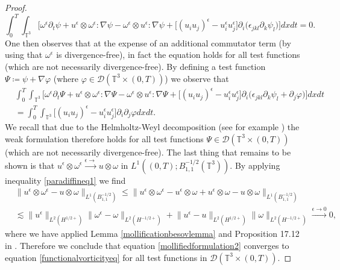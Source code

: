 \documentclass[12pt,a4paper]{article}
\theoremstyle{definition}
\theoremstyle{remark}
\numberwithin{equation}{section}
\begin{document}
\begin{proof}
\begin{equation*}
\int_0^T \int_{\mathbb{T}^3} \bigg[ \omega^\epsilon \partial_t \psi + u^\epsilon \otimes \omega^\epsilon : \nabla \psi - \omega^\epsilon \otimes u^\epsilon : \nabla \psi + \big[ (u_i u_j)^\epsilon - u_i^\epsilon u_j^\epsilon \big] \partial_i \big( \epsilon_{jkl} \partial_k \psi_l \big) \bigg] dx dt = 0.
\end{equation*}
One then observes that at the expense of an additional commutator term (by using that $\omega^\epsilon$ is divergence-free), in fact the equation holds for all test functions (which are not necessarily divergence-free). By defining a test function $\Psi \coloneqq \psi + \nabla \varphi$ (where $\varphi \in \mathcal{D} (\mathbb{T}^3 \times (0,T))$) we observe that
\begin{align}
&\int_0^T \int_{\mathbb{T}^3} \bigg[ \omega^\epsilon \partial_t \Psi + u^\epsilon \otimes \omega^\epsilon : \nabla \Psi - \omega^\epsilon \otimes u^\epsilon : \nabla \Psi + \big[ (u_i u_j)^\epsilon - u_i^\epsilon u_j^\epsilon \big] \partial_i \big( \epsilon_{jkl} \partial_k \psi_l + \partial_j \varphi \big) \bigg] dx dt \nonumber \\
&= \int_0^T \int_{\mathbb{T}^3} \big[ (u_i u_j)^\epsilon - u_i^\epsilon u_j^\epsilon \big] \partial_i \partial_j \varphi dx dt. \label{mollifiedformulation2}
\end{align}
We recall that due to the Helmholtz-Weyl decomposition (see for example \cite[~Theorem 2.6]{robinsonbook}) the weak formulation therefore holds for all test functions $\Psi \in \mathcal{D} (\mathbb{T}^3 \times (0,T))$ (which are not necessarily divergence-free). The last thing that remains to be shown is that $u^\epsilon \otimes \omega^\epsilon \xrightarrow[]{\epsilon \rightarrow} u \otimes \omega$ in $L^1 ((0,T); B^{-1/2}_{1,1} (\mathbb{T}^3))$. By applying inequality \eqref{paradiffineq1} we find
\begin{align*}
&\lVert u^\epsilon \otimes \omega^\epsilon - u \otimes \omega \rVert_{L^1 (B^{-1/2}_{1,1})} \leq \lVert u^\epsilon \otimes \omega^\epsilon - u^\epsilon \otimes \omega + u^\epsilon \otimes \omega - u \otimes \omega \rVert_{L^1 (B^{-1/2}_{1,1})} \\
&\lesssim \lVert u^\epsilon \rVert_{L^2 (H^{1/2+})} \lVert \omega^\epsilon - \omega \rVert_{L^2 (H^{-1/2+})} + \lVert u^\epsilon - u \rVert_{L^2 (H^{1/2+})} \lVert \omega \rVert_{L^2 (H^{-1/2+})} \xrightarrow[]{\epsilon \rightarrow 0} 0,
\end{align*}
where we have applied Lemma \ref{mollificationbesovlemma} and Proposition 17.12 in \cite{leoni}. Therefore we conclude that equation \eqref{mollifiedformulation2} converges to equation \eqref{functionalvorticityeq} for all test functions in $\mathcal{D} (\mathbb{T}^3 \times (0,T))$.
\end{proof}
\end{document}
